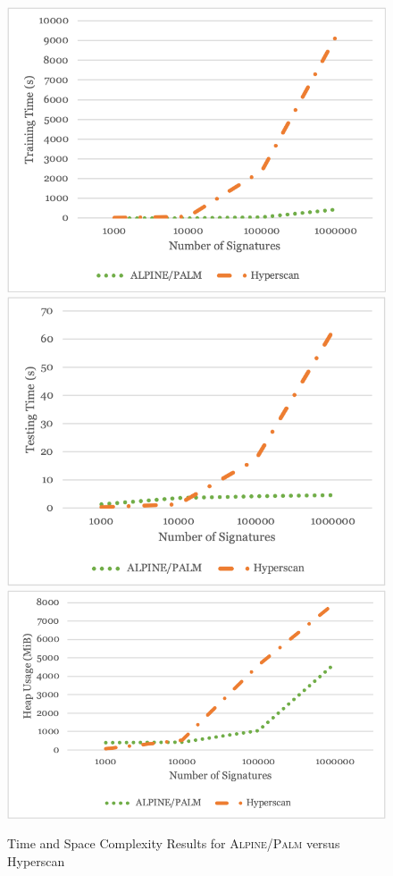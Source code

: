 \begin{figure} [ht!]
  \centering
  \includegraphics[width=0.6\columnwidth]{chapters/4/img/trainingtime.png}
  \includegraphics[width=0.6\columnwidth]{chapters/4/img/testingtime.png}
  \includegraphics[width=0.6\columnwidth]{chapters/4/img/memoryusage.png}
  \caption{Time and Space Complexity Results for \textsc{Alpine}/\textsc{Palm} versus Hyperscan}
  \label{fig:hyperscancompare}
\end{figure}
